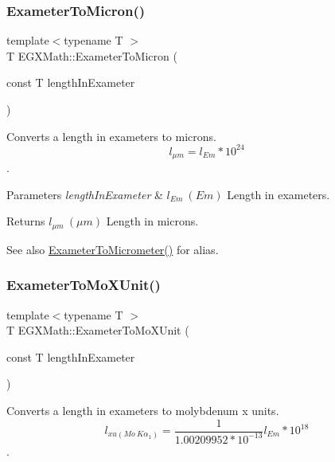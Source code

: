 \subsubsection{\texorpdfstring{Exameter\+To\+Micron()}{ExameterToMicron()}}
{\footnotesize\ttfamily template$<$typename T $>$ \\
T E\+G\+X\+Math\+::\+Exameter\+To\+Micron (\begin{DoxyParamCaption}\item[{const T}]{length\+In\+Exameter }\end{DoxyParamCaption})}



Converts a length in exameters to microns. \[ l_{\mu m}=l_{Em} * 10^{24} \]. 


\begin{DoxyParams}{Parameters}
{\em length\+In\+Exameter} & $ l_{Em}\ (Em)$ Length in exameters. \\
\hline
\end{DoxyParams}
\begin{DoxyReturn}{Returns}
$ l_{\mu m}\ (\mu m)$ Length in microns. 
\end{DoxyReturn}
\begin{DoxySeeAlso}{See also}
\mbox{\hyperlink{group___e_g_x_math-_conversions-_length_conversions-_exameter-_s_i_gaee4a8b1fa77d023e7db7180e62646388}{Exameter\+To\+Micrometer()}} for alias. 
\end{DoxySeeAlso}
\mbox{\label{group___e_g_x_math-_conversions-_length_conversions-_exameter-_non-_s_i_gadf73e46609660df6b7ae77ec7241183e}} 
\subsubsection{\texorpdfstring{Exameter\+To\+Mo\+X\+Unit()}{ExameterToMoXUnit()}}
{\footnotesize\ttfamily template$<$typename T $>$ \\
T E\+G\+X\+Math\+::\+Exameter\+To\+Mo\+X\+Unit (\begin{DoxyParamCaption}\item[{const T}]{length\+In\+Exameter }\end{DoxyParamCaption})}



Converts a length in exameters to molybdenum x units. \[ l_{xu(Mo\ K\alpha_1)}=\frac{1}{1.00209952*10^{-13}} l_{Em} * 10^{18}\]. 



